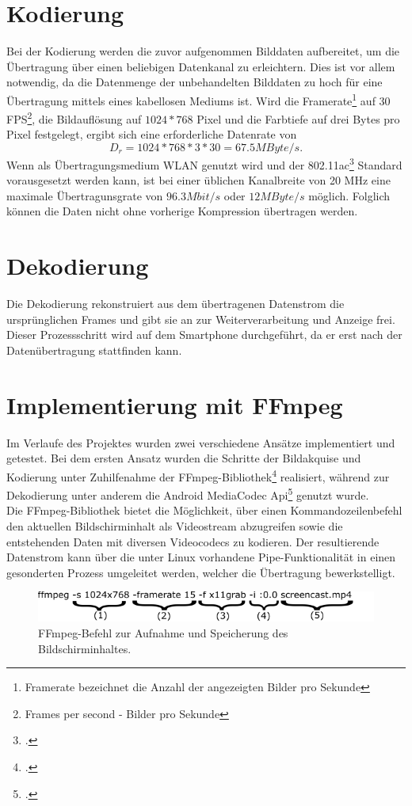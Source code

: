 \section{Kodierung}
Bei der Kodierung werden die zuvor aufgenommen Bilddaten aufbereitet, um die Übertragung über einen beliebigen Datenkanal zu erleichtern. Dies ist vor allem notwendig, da die Datenmenge der unbehandelten Bilddaten zu hoch für eine Übertragung mittels eines kabellosen Mediums ist.  Wird die Framerate\footnote{Framerate bezeichnet die Anzahl der angezeigten Bilder pro Sekunde} auf 30 FPS\footnote{Frames per second - Bilder pro Sekunde}, die Bildauflösung auf $1024*768$ Pixel und die Farbtiefe auf drei Bytes pro Pixel festgelegt, ergibt sich eine erforderliche Datenrate von
\begin{equation}
D_r=1024*768*3*30=67.5 MByte/s.
\end{equation}
Wenn als Übertragungsmedium WLAN genutzt wird und der 802.11ac\footcite{WIFIStandard} Standard vorausgesetzt werden kann, ist bei einer üblichen Kanalbreite von 20 MHz eine maximale Übertragunsgrate von $96.3 Mbit/s$ oder $12 MByte/s$ möglich. Folglich können die Daten nicht ohne vorherige Kompression übertragen werden.

\section{Dekodierung}
Die Dekodierung rekonstruiert aus dem übertragenen Datenstrom die ursprünglichen Frames und gibt sie an zur Weiterverarbeitung und Anzeige frei. Dieser Prozessschritt wird auf dem Smartphone durchgeführt, da er erst nach der Datenübertragung stattfinden kann.

\section{Implementierung mit FFmpeg}
Im Verlaufe des Projektes wurden zwei verschiedene Ansätze implementiert und getestet. Bei dem ersten Ansatz wurden die Schritte der Bildakquise und Kodierung unter Zuhilfenahme der FFmpeg-Bibliothek\footcite{FFmpeg} realisiert, während zur Dekodierung unter anderem die Android MediaCodec Api\footcite{AndroidMediaCodec} genutzt wurde.\\
Die FFmpeg-Bibliothek bietet die Möglichkeit, über einen Kommandozeilenbefehl den aktuellen Bildschirminhalt als Videostream abzugreifen sowie die entstehenden Daten mit diversen Videocodecs zu kodieren. Der resultierende Datenstrom kann über die unter Linux vorhandene Pipe-Funktionalität in einen gesonderten Prozess umgeleitet werden, welcher die Übertragung bewerkstelligt.\\
\begin{figure}[H]
	\includegraphics[width=1\textwidth]{Bilder/BildakquiseUndDatenaufbereitung/ffmpeg_befehl1.pdf}
	\caption{FFmpeg-Befehl zur Aufnahme und Speicherung des Bildschirminhaltes.}
	\label{fig:FFmpeg_befehl1}
\end{figure}

